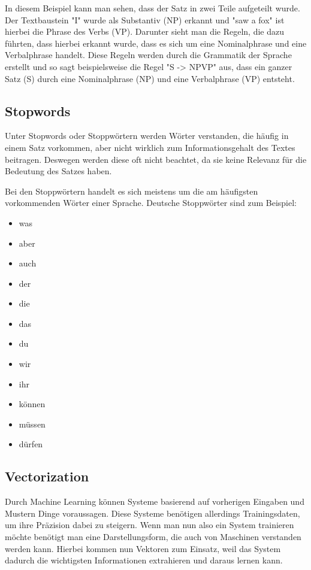In diesem Beispiel kann man sehen, dass der Satz in zwei Teile aufgeteilt wurde.
Der Textbaustein "I" wurde als Substantiv (NP) erkannt und "saw a fox" ist hierbei die Phrase des Verbs (VP).
Darunter sieht man die Regeln, die dazu führten, dass hierbei erkannt wurde, dass es sich um eine Nominalphrase und eine Verbalphrase handelt.
Diese Regeln werden durch die Grammatik der Sprache erstellt und so sagt beispielsweise die Regel "S -> NPVP" aus, dass ein ganzer Satz (S) durch eine Nominalphrase (NP) und eine Verbalphrase (VP) entsteht.\cite{dependencyVsConstituencyParsing}

\subsection{Stopwords}

Unter Stopwords oder Stoppwörtern werden Wörter verstanden, die häufig in einem Satz vorkommen, aber nicht wirklich zum Informationsgehalt des Textes beitragen.
Deswegen werden diese oft nicht beachtet, da sie keine Relevanz für die Bedeutung des Satzes haben.

Bei den Stoppwörtern handelt es sich meistens um die am häufigsten vorkommenden Wörter einer Sprache.
Deutsche Stoppwörter sind zum Beispiel:\cite{germanStopwords}

\begin{itemize}
    \item was
    \item aber
    \item auch
    \item der
    \item die
    \item das
    \item du
    \item wir
    \item ihr
    \item können
    \item müssen
    \item dürfen
\end{itemize}

\subsection{Vectorization}

Durch Machine Learning können Systeme basierend auf vorherigen Eingaben und Mustern Dinge voraussagen.
Diese Systeme benötigen allerdings Trainingsdaten, um ihre Präzision dabei zu steigern.
Wenn man nun also ein System trainieren möchte benötigt man eine Darstellungsform, die auch von Maschinen verstanden werden kann.
Hierbei kommen nun Vektoren zum Einsatz, weil das System dadurch die wichtigsten Informationen extrahieren und daraus lernen kann.

